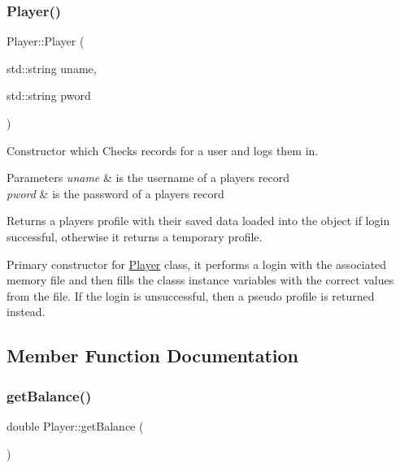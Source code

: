 \subsubsection{\texorpdfstring{Player()}{Player()}\hspace{0.1cm}{\footnotesize\ttfamily [2/2]}}
{\footnotesize\ttfamily Player\+::\+Player (\begin{DoxyParamCaption}\item[{std\+::string}]{uname,  }\item[{std\+::string}]{pword }\end{DoxyParamCaption})}



Constructor which Checks records for a user and logs them in. 


\begin{DoxyParams}{Parameters}
{\em uname} & is the username of a player\textquotesingle{}s record \\
\hline
{\em pword} & is the password of a player\textquotesingle{}s record \\
\hline
\end{DoxyParams}
\begin{DoxyReturn}{Returns}
a player\textquotesingle{}s profile with their saved data loaded into the object if login successful, otherwise it returns a temporary profile.
\end{DoxyReturn}
Primary constructor for \hyperlink{classPlayer}{Player} class, it performs a login with the associated memory file and then fills the class\textquotesingle{}s instance variables with the correct values from the file. If the login is unsuccessful, then a pseudo profile is returned instead. 

\subsection{Member Function Documentation}
\mbox{\label{classPlayer_a0e9f70886f4a7544422931103e59ea26}} 
\subsubsection{\texorpdfstring{get\+Balance()}{getBalance()}}
{\footnotesize\ttfamily double Player\+::get\+Balance (\begin{DoxyParamCaption}{ }\end{DoxyParamCaption})}




